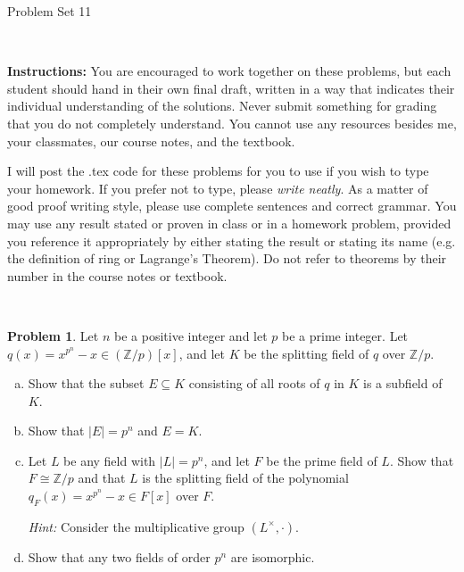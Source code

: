 \documentclass[11pt]{article}
\title{}
\date{\vspace{-0.5in}}
\newcommand{\Z}{\mathbb{Z}}
\theoremstyle{definition}
\newtheorem{problem}{Problem}
\begin{document}
\thispagestyle{fancy}
\pagestyle{fancy}

\vspace{3em}

\begin{center}
	{\LARGE Problem Set 11}
\end{center}

\

\noindent
{\bf Instructions:}
You are encouraged to work together on these problems, but each student should hand in their own final draft, written in a way that indicates their individual understanding of the solutions. Never submit something for grading that you do not completely understand. You cannot use any resources besides me, your classmates, our course notes, and the textbook.


I will post the .tex code for these problems for you to use if you wish to type your homework. If you prefer not to type, please  {\em write neatly}. As a matter of good proof writing style, please use complete sentences and correct grammar. You may use any result  stated or proven in class or in a homework problem, provided you reference it appropriately by either stating the result or stating its name (e.g. the definition of ring or Lagrange's Theorem). Do not refer to theorems by their number in the course notes or textbook.


\


\begin{problem}
Let $n$ be a positive integer and let $p$ be a prime integer. Let $q(x) = x^{p^n} - x \in (\Z/p)[x]$, and let $K$ be the splitting field of $q$ over $\Z/p$. 

\begin{enumerate}[a)]
\item Show that the subset $E \subseteq K$ consisting of all roots of $q$ in $K$ is a subfield of $K$. 


\item Show that $|E| = p^n$ and $E = K$. 



\item Let $L$ be any field with $|L| = p^n$, and let $F$ be the prime field of $L$. Show that $F \cong \Z/p$ and that $L$ is the splitting field of the polynomial $q_F(x)= x^{p^n} - x\in F[x]$ over $F$. 

{\em Hint:} Consider the multiplicative group $(L^\times, \cdot)$.

\item Show that any two fields of order $p^n$ are isomorphic.
\end{enumerate}
\end{problem}
\end{document}
